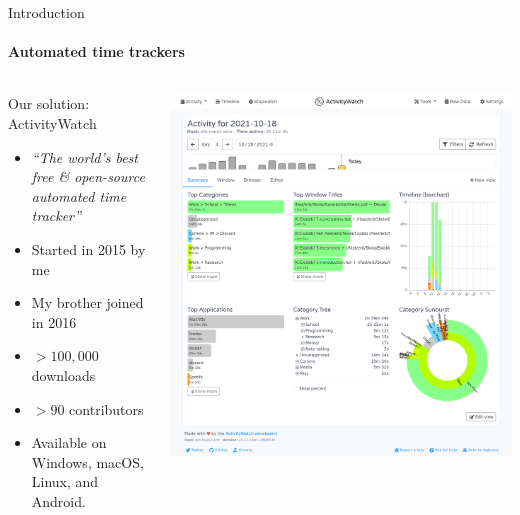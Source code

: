 \documentclass[xcolor={dvipsnames,table},12pt]{beamer}
\newif\ifplacelogo{}  %
\begin{document}
\placelogofalse{}
\begin{frame}{Introduction}
    \framesubtitle{Automated time trackers}

    \begin{columns}
        \begin{column}{0.5\textwidth}
            \hspace{0.4em}
            \begingroup
                \scriptsize
                Our solution:
                \\
            \endgroup
            \vspace{0.2em}
            \hspace{0.4em}
            \begingroup
                \large
                ActivityWatch
            \endgroup
            \vspace{0.5em}

            \begin{itemize}
                \item{\emph{``The world's best free \& open-source automated time tracker''}}
                \item Started in 2015 by me
                \item My brother joined in 2016
                \item ${>}100{,}000$ downloads
                \item ${>}90$ contributors
                \item Available on Windows, macOS, Linux, and Android.
            \end{itemize}

            \vfill
        \end{column}
        \begin{column}{0.6\textwidth}
            \includegraphics[width=\textwidth]{img/screenshot-aw-activity.png}
        \end{column}
    \end{columns}
\end{frame}
\placelogotrue{}
\end{document}
